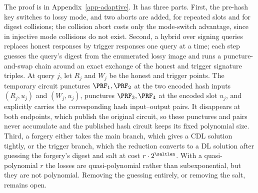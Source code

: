 The proof is in Appendix~\ref{app-adaptive}. It has three parts. First, the pre-hash key switches to lossy mode, and two aborts are added, for repeated slots and for digest collisions; the collision abort costs only the mode-switch advantage, since in injective mode collisions do not exist. Second, a hybrid over signing queries replaces honest responses by trigger responses one query at a time; each step guesses the query's digest from the enumerated lossy image and runs a puncture-and-swap chain around an exact exchange of the honest and trigger signature triples. At query $j$, let $R_j$ and $W_j$ be the honest and trigger points. The temporary circuit punctures $\PRF_1,\PRF_2$ at the two encoded hash inputs $(R_j,u_j)$ and $(W_j,u_j)$, punctures $\PRF_3,\PRF_4$ at the encoded slot $u_j$, and explicitly carries the corresponding hash input--output pairs. It disappears at both endpoints, which publish the original circuit, so these punctures and pairs never accumulate and the published hash circuit keeps its fixed polynomial size. Third, a forgery either takes the main branch, which gives a CDL solution tightly, or the trigger branch, which the reduction converts to a DL solution after guessing the forgery's digest and salt at cost $r\cdot2^{\saltlen}$. With a quasi-polynomial $r$ the losses are quasi-polynomial rather than subexponential, but they are not polynomial. Removing the guessing entirely, or removing the salt, remains open.
